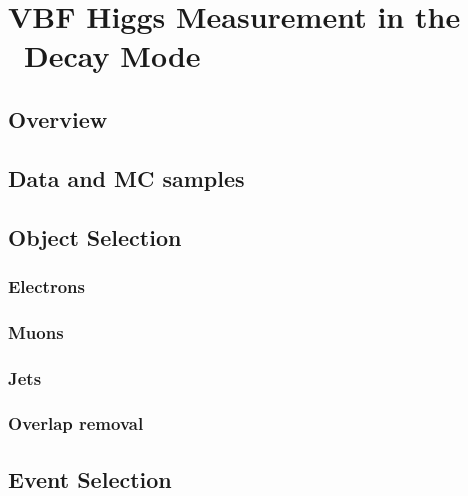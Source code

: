 \chapter{VBF Higgs Measurement in the \wwlnln~Decay Mode}
\label{chap:analysis}


\section{Overview}

%

\section{Data and MC samples}
\label{sec:data_mc}

%

\section{Object Selection}

\subsection{Electrons}

\subsection{Muons}

\subsection{Jets}

\subsection{Overlap removal}

\subsection{\etmiss}

\section{Event Selection}

